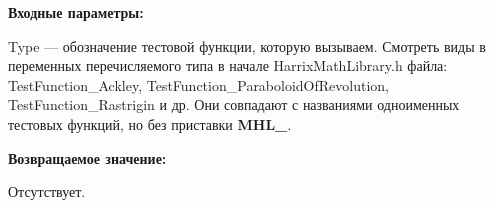 \textbf{Входные параметры:}
  
Type --- обозначение тестовой функции, которую вызываем.
Смотреть виды в переменных перечисляемого типа в начале HarrixMathLibrary.h файла: TestFunction\_Ackley, TestFunction\_ParaboloidOfRevolution, TestFunction\_Rastrigin и др. Они совпадают с названиями одноименных тестовых функций, но без приставки \textbf{MHL\_}.

\textbf{Возвращаемое значение:}
 
Отсутствует.